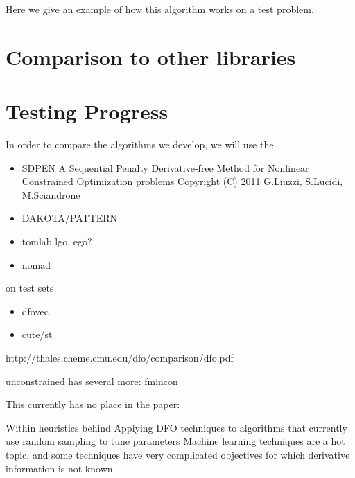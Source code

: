 \documentclass{article}
\begin{document}
Here we give an example of how this algorithm works on a test problem.

\section{Comparison to other libraries}
\section{Testing Progress}
In order to compare the algorithms we develop, we will use the

\begin{itemize}
\item SDPEN
A Sequential Penalty Derivative-free Method for Nonlinear
Constrained Optimization problems
Copyright (C) 2011  G.Liuzzi, S.Lucidi, M.Sciandrone
\item DAKOTA/PATTERN
\item tomlab lgo, ego?
\item nomad
\end{itemize}

on test sets

\begin{itemize}
\item dfovec
\item cute/st
\end{itemize}

http://thales.cheme.cmu.edu/dfo/comparison/dfo.pdf


unconstrained has several more:
fmincon


This currently has no place in the paper:

Within heuristics behind
Applying DFO techniques to algorithms that currently use random sampling to tune parameters
Machine learning techniques are a hot topic, and some techniques have very complicated objectives for which derivative information is not known.



\newpage



\end{document}
